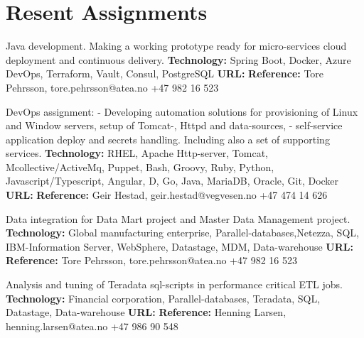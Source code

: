 \documentclass[11pt,a4paper,sans]{moderncv} %
\begin{document}
\pagebreak


\section{Resent Assignments}

{
Java development. Making a working prototype ready for micro-services cloud deployment and continuous delivery.
\newline{}\textbf{Technology:}
Spring Boot, Docker, Azure DevOps, Terraform, Vault, Consul, PostgreSQL
\newline{}\textbf{URL:} 
\newline{}\textbf{Reference:} Tore Pehrsson, tore.pehrsson@atea.no +47 982 16 523
}

{
DevOps assignment: - Developing automation solutions for provisioning of Linux and Window servers, setup of Tomcat-, Httpd and data-sources, - self-service application deploy and secrets handling. Including also a set of supporting services.
\newline{}\textbf{Technology:}
RHEL, Apache Http-server, Tomcat, Mcollective/ActiveMq, Puppet, Bash, Groovy, Ruby, Python, Javascript/Typescript, Angular, D, Go, Java, MariaDB, Oracle, Git, Docker
\newline{}\textbf{URL:} 
\newline{}\textbf{Reference:} Geir Hestad, geir.hestad@vegvesen.no +47 474 14 626
}

{
Data integration for Data Mart project and Master Data Management project.
\newline{}\textbf{Technology:}
Global manufacturing enterprise, Parallel-databases,Netezza, SQL, IBM-Information Server, WebSphere, Datastage, MDM, Data-warehouse
\newline{}\textbf{URL:} 
\newline{}\textbf{Reference:} Tore Pehrsson, tore.pehrsson@atea.no +47 982 16 523
}

{
Analysis and tuning of Teradata sql-scripts in performance critical ETL jobs.
\newline{}\textbf{Technology:} Financial corporation, Parallel-databases, Teradata, SQL, Datastage, Data-warehouse
\newline{}\textbf{URL:} 
\newline{}\textbf{Reference:} Henning Larsen, henning.larsen@atea.no +47 986 90 548
}
\end{document}
